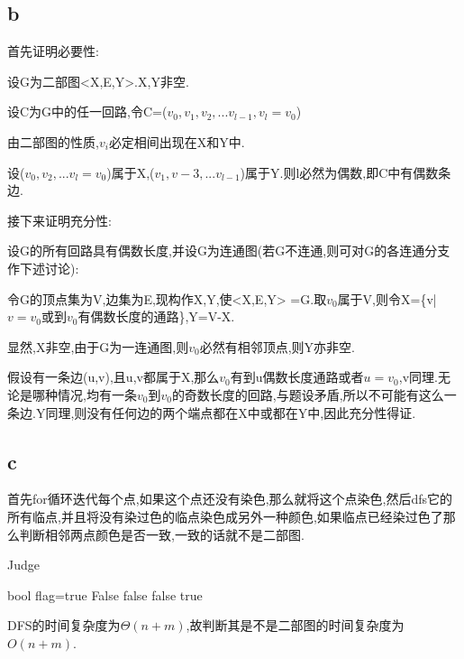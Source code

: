 \documentclass[12pt,a4paper,fontset=none]{ctexart}
\begin{document}
\subsection{b}
首先证明必要性:

设G为二部图<X,E,Y>.X,Y非空.

设C为G中的任一回路,令C=($v_0,v_1,v_2,...v_{l-1},v_l=v_0$)

由二部图的性质,$v_i$必定相间出现在X和Y中.

设($v_0,v_2,...v_l=v_0$)属于X,($v_1,v-3,...v_{l-1}$)属于Y.则l必然为偶数,即C中有偶数条边.

接下来证明充分性:

设G的所有回路具有偶数长度,并设G为连通图(若G不连通,则可对G的各连通分支作下述讨论):

令G的顶点集为V,边集为E,现构作X,Y,使<X,E,Y> =G.取$v_0$属于V,则令X=\{v|$v=v_0$或到$v_0$有偶数长度的通路\},Y=V-X.

显然,X非空,由于G为一连通图,则$v_0$必然有相邻顶点,则Y亦非空.

假设有一条边(u,v),且u,v都属于X,那么$v_0$有到u偶数长度通路或者$u=v_0$,v同理.无论是哪种情况,均有一条$v_0$到$v_0$的奇数长度的回路,与题设矛盾,所以不可能有这么一条边.Y同理,则没有任何边的两个端点都在X中或都在Y中,因此充分性得证.
\subsection{c}
首先for循环迭代每个点,如果这个点还没有染色,那么就将这个点染色,然后dfs它的所有临点,并且将没有染过色的临点染色成另外一种颜色,如果临点已经染过色了那么判断相邻两点颜色是否一致,一致的话就不是二部图.
\begin{algorithm}
    \renewcommand{\algorithmicensure}{\textbf{Output:}}
    \renewcommand{\algorithmicrequire}{\textbf{Input:}}
    \caption{Judge}
    \label{alg3}
    \begin{algorithmic}
        \State bool flag=true
        \State \Return False
        \EndIf
        \EndIf
        \EndFor
        \Return false
        \EndIf
        \EndIf
        \Return false
        \EndIf
        \EndFor
        \State \Return true
        \EndFunction
    \end{algorithmic}
\end{algorithm}
DFS的时间复杂度为$\Theta(n+m)$,故判断其是不是二部图的时间复杂度为$O(n+m)$.
\end{document}
